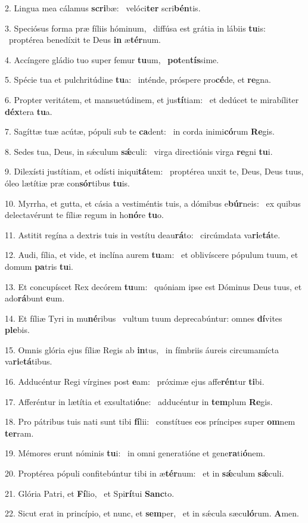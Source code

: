 2. Lingua mea cálamus \textbf{scri}bæ: \ast\  velóci\textbf{ter} scri\textbf{bén}tis.\

3. Speciósus forma præ fíliis hóminum, \dag\  diffúsa est grátia in lábiis \textbf{tu}is: \ast\  proptérea benedíxit te Deus \textbf{in} æ\textbf{tér}num.\

4. Accíngere gládio tuo super femur \textbf{tu}um, \ast\  \textbf{pot}en\textbf{tís}sime.\

5. Spécie tua et pulchritúdine \textbf{tu}a: \ast\  inténde, próspere pro\textbf{cé}de, et \textbf{re}gna.\

6. Propter veritátem, et mansuetúdinem, et jus\textbf{tí}tiam: \ast\  et dedúcet te mirabíliter \textbf{déx}tera \textbf{tu}a.\

7. Sagíttæ tuæ acútæ, pópuli sub te \textbf{ca}dent: \ast\  in corda inimi\textbf{có}rum \textbf{Re}gis.\

8. Sedes tua, Deus, in sǽculum \textbf{sǽ}culi: \ast\  virga directiónis virga \textbf{re}gni \textbf{tu}i.\

9. Dilexísti justítiam, et odísti iniqui\textbf{tá}tem: \ast\  proptérea unxit te, Deus, Deus tuus, óleo lætítiæ præ con\textbf{sór}tibus \textbf{tu}is.\

10. Myrrha, et gutta, et cásia a vestiméntis tuis, a dómibus e\textbf{búr}neis: \ast\  ex quibus delectavérunt te fíliæ regum in ho\textbf{nó}re \textbf{tu}o.\

11. Astitit regína a dextris tuis in vestítu deau\textbf{rá}to: \ast\  circúmdata va\textbf{ri}e\textbf{tá}te.\

12. Audi, fília, et vide, et inclína aurem \textbf{tu}am: \ast\  et oblivíscere pópulum tuum, et domum \textbf{pa}tris \textbf{tu}i.\

13. Et concupíscet Rex decórem \textbf{tu}um: \ast\  quóniam ipse est Dóminus Deus tuus, et ado\textbf{rá}bunt \textbf{e}um.\

14. Et fíliæ Tyri in mu\textbf{né}ribus \ast\  vultum tuum deprecabúntur: omnes \textbf{dí}vites \textbf{ple}bis.\

15. Omnis glória ejus fíliæ Regis ab \textbf{in}tus, \ast\  in fímbriis áureis circumamícta va\textbf{ri}e\textbf{tá}tibus.\

16. Adducéntur Regi vírgines post \textbf{e}am: \ast\  próximæ ejus affe\textbf{rén}tur \textbf{ti}bi.\

17. Afferéntur in lætítia et exsultati\textbf{ó}ne: \ast\  adducéntur in \textbf{tem}plum \textbf{Re}gis.\

18. Pro pátribus tuis nati sunt tibi \textbf{fí}lii: \ast\  constítues eos príncipes super \textbf{om}nem \textbf{ter}ram.\

19. Mémores erunt nóminis \textbf{tu}i: \ast\  in omni generatióne et gene\textbf{ra}ti\textbf{ó}nem.\

20. Proptérea pópuli confitebúntur tibi in æ\textbf{tér}num: \ast\  et in \textbf{sǽ}culum \textbf{sǽ}culi.\

21. Glória Patri, et \textbf{Fí}lio, \ast\  et Spi\textbf{rí}tui \textbf{Sanc}to.\

22. Sicut erat in princípio, et nunc, et \textbf{sem}per, \ast\  et in sǽcula sæcu\textbf{ló}rum. \textbf{A}men.\

